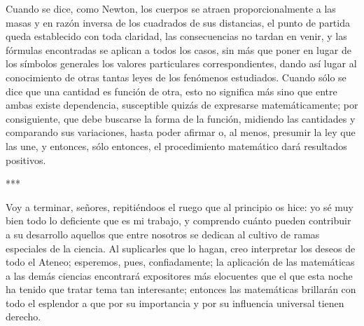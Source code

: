 \documentclass[a4paper, 12pt]{article}
\begin{document}
Cuando se dice, como Newton, los cuerpos se atraen proporcionalmente a las masas y en razón inversa de los cuadrados de sus distancias, el punto de partida queda establecido con toda claridad, las consecuencias no tardan en venir, y las fórmulas encontradas se aplican a todos los casos, sin más que poner en lugar de los símbolos generales los valores particulares correspondientes, dando así lugar al conocimiento de otras tantas leyes de los fenómenos estudiados. Cuando sólo se dice que una cantidad es función de otra, esto no significa más sino que entre ambas existe dependencia, susceptible quizás de expresarse matemáticamente; por consiguiente, que debe buscarse la forma de la función, midiendo 
las cantidades y comparando sus variaciones, hasta poder afirmar o, al menos, presumir la ley que las une, y entonces, sólo entonces, el procedimiento matemático dará resultados positivos.

\bigskip

\centerline{***}


Voy a terminar, señores, repitiéndoos el ruego que al principio os hice: yo sé muy bien todo lo deficiente que es mi trabajo, y comprendo cuánto pueden contribuir a su desarrollo aquellos que entre nosotros se dedican al cultivo de ramas especiales de la ciencia. Al suplicarles que lo hagan, creo interpretar los deseos de todo el Ateneo; esperemos, pues, confiadamente; la aplicación de las matemáticas a las demás ciencias encontrará expositores más elocuentes que el que esta noche ha tenido que tratar tema tan interesante; entonces las matemáticas brillarán con todo el esplendor a que por su importancia y por su influencia universal tienen derecho.
\end{document}
